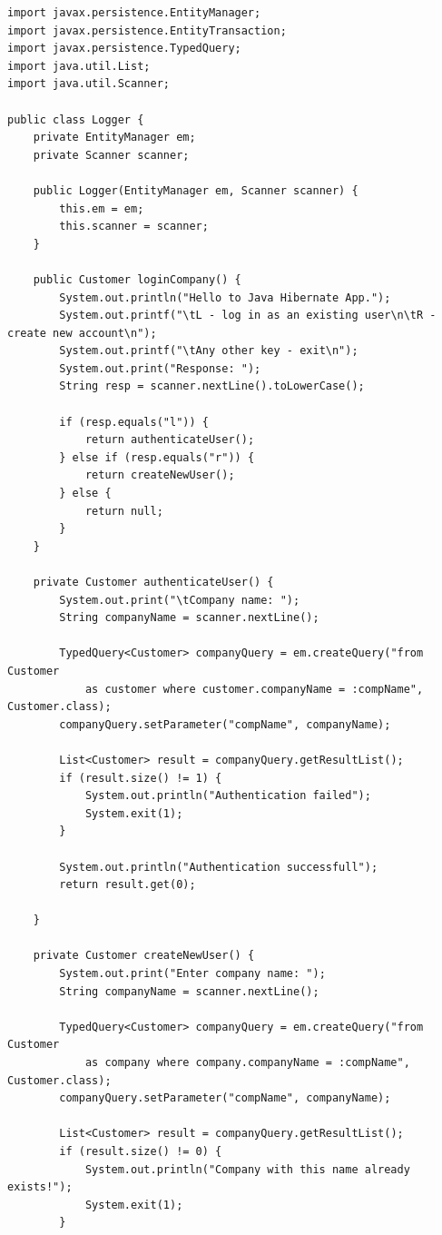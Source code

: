 \documentclass[12pt, a4paper]{mwart}
\begin{document}
\begin{lstlisting}
import javax.persistence.EntityManager;
import javax.persistence.EntityTransaction;
import javax.persistence.TypedQuery;
import java.util.List;
import java.util.Scanner;

public class Logger {
    private EntityManager em;
    private Scanner scanner;

    public Logger(EntityManager em, Scanner scanner) {
        this.em = em;
        this.scanner = scanner;
    }

    public Customer loginCompany() {
        System.out.println("Hello to Java Hibernate App.");
        System.out.printf("\tL - log in as an existing user\n\tR - create new account\n");
        System.out.printf("\tAny other key - exit\n");
        System.out.print("Response: ");
        String resp = scanner.nextLine().toLowerCase();

        if (resp.equals("l")) {
            return authenticateUser();
        } else if (resp.equals("r")) {
            return createNewUser();
        } else {
            return null;
        }
    }

    private Customer authenticateUser() {
        System.out.print("\tCompany name: ");
        String companyName = scanner.nextLine();

        TypedQuery<Customer> companyQuery = em.createQuery("from Customer 
        	as customer where customer.companyName = :compName", Customer.class);
        companyQuery.setParameter("compName", companyName);

        List<Customer> result = companyQuery.getResultList();
        if (result.size() != 1) {
            System.out.println("Authentication failed");
            System.exit(1);
        }

        System.out.println("Authentication successfull");
        return result.get(0);

    }

    private Customer createNewUser() {
        System.out.print("Enter company name: ");
        String companyName = scanner.nextLine();

        TypedQuery<Customer> companyQuery = em.createQuery("from Customer 
        	as company where company.companyName = :compName", Customer.class);
        companyQuery.setParameter("compName", companyName);

        List<Customer> result = companyQuery.getResultList();
        if (result.size() != 0) {
            System.out.println("Company with this name already exists!");
            System.exit(1);
        }


\end{lstlisting}
\end{document}
